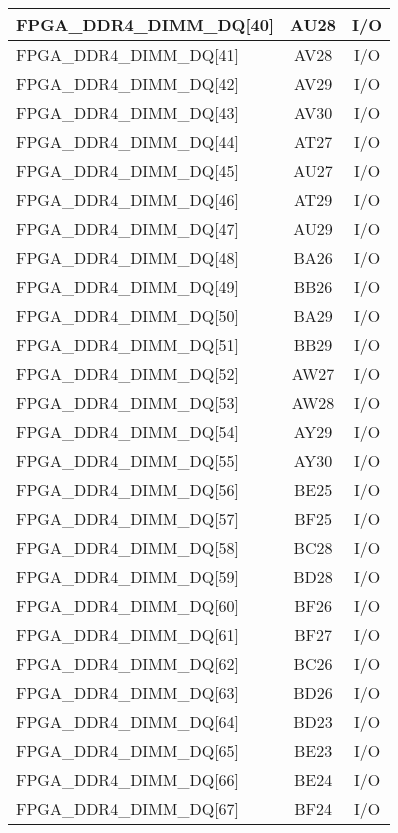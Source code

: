 \begin{longtable}[l]{| l | c | c |}
  FPGA\_DDR4\_DIMM\_DQ[40]     & AU28 & I/O \\ \hline
  FPGA\_DDR4\_DIMM\_DQ[41]     & AV28 & I/O \\ \hline
  FPGA\_DDR4\_DIMM\_DQ[42]     & AV29 & I/O \\ \hline
  FPGA\_DDR4\_DIMM\_DQ[43]     & AV30 & I/O \\ \hline
  FPGA\_DDR4\_DIMM\_DQ[44]     & AT27 & I/O \\ \hline
  FPGA\_DDR4\_DIMM\_DQ[45]     & AU27 & I/O \\ \hline
  FPGA\_DDR4\_DIMM\_DQ[46]     & AT29 & I/O \\ \hline
  FPGA\_DDR4\_DIMM\_DQ[47]     & AU29 & I/O \\ \hline
  FPGA\_DDR4\_DIMM\_DQ[48]     & BA26 & I/O \\ \hline
  FPGA\_DDR4\_DIMM\_DQ[49]     & BB26 & I/O \\ \hline
  FPGA\_DDR4\_DIMM\_DQ[50]     & BA29 & I/O \\ \hline
  FPGA\_DDR4\_DIMM\_DQ[51]     & BB29 & I/O \\ \hline
  FPGA\_DDR4\_DIMM\_DQ[52]     & AW27 & I/O \\ \hline
  FPGA\_DDR4\_DIMM\_DQ[53]     & AW28 & I/O \\ \hline
  FPGA\_DDR4\_DIMM\_DQ[54]     & AY29 & I/O \\ \hline
  FPGA\_DDR4\_DIMM\_DQ[55]     & AY30 & I/O \\ \hline
  FPGA\_DDR4\_DIMM\_DQ[56]     & BE25 & I/O \\ \hline
  FPGA\_DDR4\_DIMM\_DQ[57]     & BF25 & I/O \\ \hline
  FPGA\_DDR4\_DIMM\_DQ[58]     & BC28 & I/O \\ \hline
  FPGA\_DDR4\_DIMM\_DQ[59]     & BD28 & I/O \\ \hline
  FPGA\_DDR4\_DIMM\_DQ[60]     & BF26 & I/O \\ \hline
  FPGA\_DDR4\_DIMM\_DQ[61]     & BF27 & I/O \\ \hline
  FPGA\_DDR4\_DIMM\_DQ[62]     & BC26 & I/O \\ \hline
  FPGA\_DDR4\_DIMM\_DQ[63]     & BD26 & I/O \\ \hline
  FPGA\_DDR4\_DIMM\_DQ[64]     & BD23 & I/O \\ \hline
  FPGA\_DDR4\_DIMM\_DQ[65]     & BE23 & I/O \\ \hline
  FPGA\_DDR4\_DIMM\_DQ[66]     & BE24 & I/O \\ \hline
  FPGA\_DDR4\_DIMM\_DQ[67]     & BF24 & I/O \\ \hline

\end{longtable}
